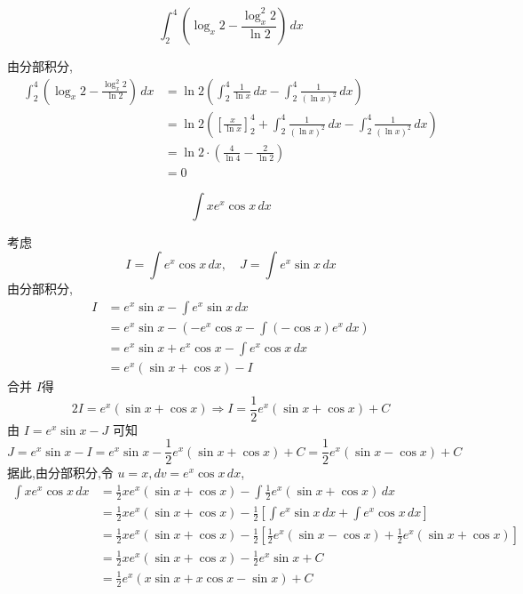 \begin{questions}
    \question  
    \[
    \int_2^4 \left(\log_x 2 - \frac{\log_x^2 2}{\ln 2}\right)\, dx
    \]
    \begin{solution}
        由分部积分,
        \begin{align*}
        \int_2^4 \left(\log_x 2 - \frac{\log_x^2 2}{\ln 2}\right)\, dx
        &= \ln 2 \left(\int_2^4 \frac{1}{\ln x}\, dx - \int_2^4 \frac{1}{(\ln x)^2}\, dx \right) \\
        &= \ln 2 \left(\left[\frac{x}{\ln x}\right]_2^4+ \int_2^4 \frac{1}{(\ln x)^2}\, dx - \int_2^4 \frac{1}{(\ln x)^2}\, dx \right) \\
        &= \ln 2 \cdot \left(\frac{4}{\ln 4} - \frac{2}{\ln 2}\right) \\
        &= 0
        \end{align*}
    \end{solution}

    \question 
    \[ 
    \int x e^x \cos x \,dx 
    \]
    \begin{solution}
        考虑
        \[
        I = \int e^x \cos x \,dx, \quad J =\int e^x \sin x \,dx
        \]
        由分部积分,
        \begin{align*}
        I &= e^x \sin x - \int e^x \sin x \,dx \\
        &= e^x \sin x - \left( -e^x \cos x - \int (-\cos x) e^x \,dx \right) \\
        &= e^x \sin x + e^x \cos x - \int e^x \cos x \,dx \\
        &= e^x (\sin x + \cos x) - I
        \end{align*}
        合并 $I$得
        \[
        2I = e^x (\sin x + \cos x) \Rightarrow I = \frac{1}{2} e^x (\sin x + \cos x) + C
        \]
        由 $I = e^x \sin x - J$ 可知
        \[
        J = e^x \sin x - I 
        = e^x \sin x - \frac{1}{2} e^x (\sin x + \cos x) +C 
        = \frac{1}{2} e^x (\sin x - \cos x) + C
        \]
        据此,由分部积分,令 $u=x, dv = e^x \cos x\, dx$,
        \begin{align*}
        \int x e^x \cos x \,dx &= \frac{1}{2} x e^x (\sin x + \cos x) - \int \frac{1}{2} e^x (\sin x + \cos x) \,dx \\
        &= \frac{1}{2} x e^x (\sin x + \cos x) - \frac{1}{2} \left[ \int e^x \sin x \,dx + \int e^x \cos x \,dx \right] \\
        &= \frac{1}{2} x e^x (\sin x + \cos x) - \frac{1}{2} \left[ \frac{1}{2} e^x (\sin x - \cos x) + \frac{1}{2} e^x (\sin x + \cos x) \right] \\
        &= \frac{1}{2} x e^x (\sin x + \cos x) - \frac{1}{2} e^x \sin x + C \\
        &= \frac{1}{2} e^x (x \sin x + x \cos x - \sin x) + C
        \end{align*}
    \end{solution}


\end{questions}
